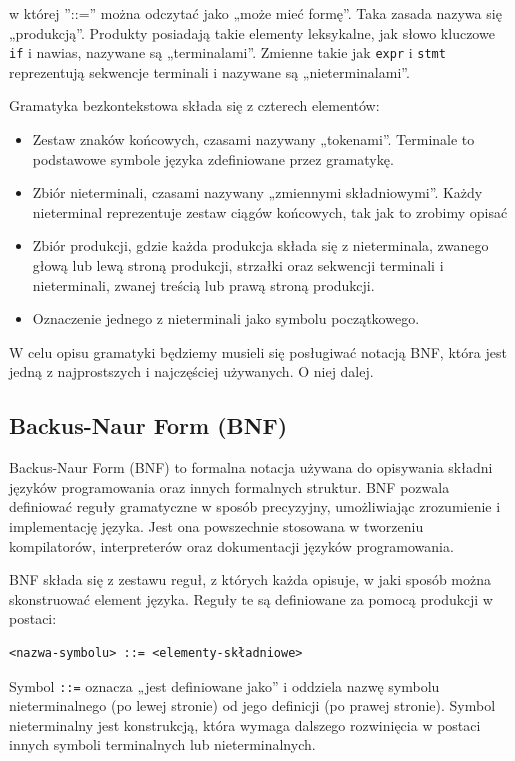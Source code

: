 w której ''::='' można odczytać jako „może mieć formę”. Taka zasada nazywa się „produkcją”. Produkty posiadają takie elementy leksykalne, jak słowo kluczowe \texttt{if} i nawias, nazywane są „terminalami”. Zmienne takie jak \texttt{expr} i \texttt{stmt} reprezentują sekwencje terminali i nazywane są „nieterminalami”.

Gramatyka bezkontekstowa składa się z czterech elementów:
\begin{itemize}
    \item Zestaw znaków końcowych, czasami nazywany „tokenami”. Terminale to podstawowe symbole języka zdefiniowane przez gramatykę.
    \item Zbiór nieterminali, czasami nazywany „zmiennymi składniowymi”. Każdy nieterminal reprezentuje zestaw ciągów końcowych, tak jak to zrobimy opisać
    \item Zbiór produkcji, gdzie każda produkcja składa się z nieterminala, zwanego głową lub lewą stroną produkcji, strzałki oraz sekwencji terminali i nieterminali, zwanej treścią lub prawą stroną produkcji.
    \item Oznaczenie jednego z nieterminali jako symbolu początkowego.
\end{itemize}

W celu opisu gramatyki będziemy musieli się posługiwać notacją BNF, która jest jedną z najprostszych i najczęściej używanych. O niej dalej.

\subsection{Backus-Naur Form (BNF)}

Backus-Naur Form (BNF) to formalna notacja używana do opisywania składni języków programowania oraz innych formalnych struktur. BNF pozwala definiować reguły gramatyczne w sposób precyzyjny, umożliwiając zrozumienie i implementację języka. Jest ona powszechnie stosowana w tworzeniu kompilatorów, interpreterów oraz dokumentacji języków programowania.

BNF składa się z zestawu reguł, z których każda opisuje, w jaki sposób można skonstruować element języka. Reguły te są definiowane za pomocą produkcji w postaci:

\begin{verbatim}
<nazwa-symbolu> ::= <elementy-składniowe>
\end{verbatim}

Symbol \texttt{::=} oznacza „jest definiowane jako” i oddziela nazwę symbolu nieterminalnego (po lewej stronie) od jego definicji (po prawej stronie). Symbol nieterminalny jest konstrukcją, która wymaga dalszego rozwinięcia w postaci innych symboli terminalnych lub nieterminalnych.

